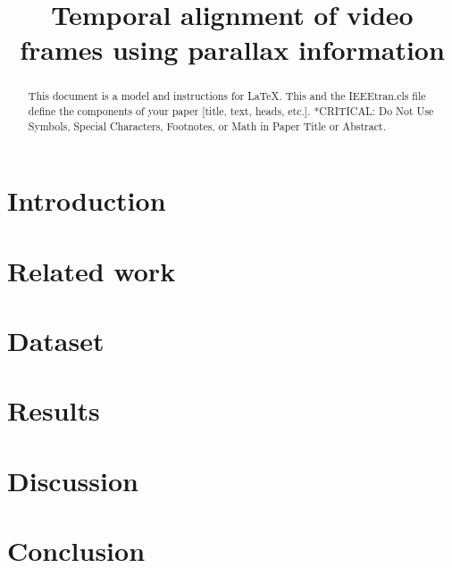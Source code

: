 \documentclass[conference]{IEEEtran}
\begin{document}
\title{Temporal alignment of video frames using parallax information} %

\author{
}

\maketitle

\begin{abstract}
This document is a model and instructions for \LaTeX.
This and the IEEEtran.cls file define the components of your paper [title, text, heads, etc.]. *CRITICAL:
Do Not Use Symbols, Special Characters, Footnotes, or Math in Paper Title or Abstract.
\end{abstract}

\begin{IEEEkeywords}
\end{IEEEkeywords}

\section{Introduction}


\section{Related work}


\section{Dataset}


\section{Results}


\section{Discussion}


\section{Conclusion}





\end{document}
